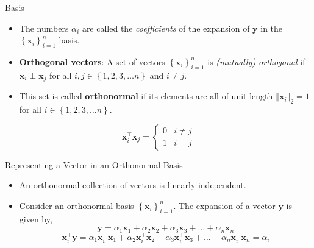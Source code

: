 \documentclass[aspectratio=169]{beamer}
\let\olditem\item
\renewcommand{\item}{\setlength{\itemsep}{\fill}\olditem}
\begin{document}
  
  \begin{frame}[t]{Basis}
  \begin{itemize}
    \item The numbers $\alpha_i$ are called the \textit{coefficients} of the expansion of $\mathbf{y}$ in the $\left\{\mathbf{x}_i\right\}_{i=1}^n$ basis.
    
    \item \textbf{Orthogonal vectors}: A set of vectors $\left\{\mathbf{x}_i\right\}_{i=1}^n$ is \textit{(mutually) orthogonal} if $\mathbf{x}_i \perp \mathbf{x}_j$ for all $i, j \in \left\{1, 2, 3, \ldots n\right\}$ and $i \neq j$.
    
    \item This set is called \textbf{orthonormal} if its elements are all of unit length $\left\Vert \mathbf{x}_i \right\Vert_2 = 1$ for all $i \in \left\{1, 2, 3, \ldots n\right\}$.
  \end{itemize}
  \[ \mathbf{x}_i^\top\mathbf{x}_j = \begin{cases} 
        0 & i \neq j \\
        1 & i = j 
     \end{cases}
  \]
  \end{frame}
  
  
  \begin{frame}[t]{Representing a Vector in an Orthonormal Basis}
  \begin{itemize}
  \item An orthonormal collection of vectors is linearly independent.
  \item Consider an orthonormal basis $\left\{\mathbf{x}_i\right\}_{i=1}^{n}$. The expansion of a vector $\mathbf{y}$ is given by,
  \[ \mathbf{y} = \alpha_1\mathbf{x}_1 + \alpha_2\mathbf{x}_2 + \alpha_3\mathbf{x}_3 + \ldots + \alpha_n\mathbf{x}_n \]
  \[ \mathbf{x}_i^\top\mathbf{y} = \alpha_1\mathbf{x}_i^\top\mathbf{x}_1 + \alpha_2\mathbf{x}_i^\top\mathbf{x}_2 + \alpha_3\mathbf{x}_i^\top\mathbf{x}_3 + \ldots + \alpha_n\mathbf{x}_i^\top\mathbf{x}_n = \alpha_i\]
  \end{itemize}
  \end{frame}
  
\end{document}
